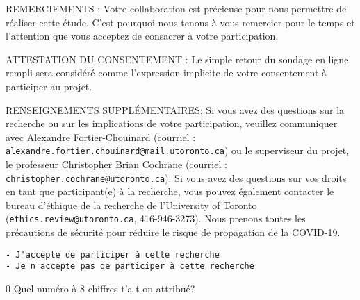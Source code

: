 \documentclass[
  letterpaper,
  DIV=11,
  numbers=noendperiod]{scrreprt}
\begin{document}
REMERCIEMENTS : Votre collaboration est précieuse pour nous permettre de
réaliser cette étude. C'est pourquoi nous tenons à vous remercier pour
le temps et l'attention que vous acceptez de consacrer à votre
participation.

ATTESTATION DU CONSENTEMENT : Le simple retour du sondage en ligne
rempli sera considéré comme l'expression implicite de votre consentement
à participer au projet.

RENSEIGNEMENTS SUPPLÉMENTAIRES: Si vous avez des questions sur la
recherche ou sur les implications de votre participation, veuillez
communiquer avec Alexandre Fortier-Chouinard (courriel :
\texttt{alexandre.fortier.chouinard@mail.utoronto.ca}) ou le superviseur
du projet, le professeur Christopher Brian Cochrane (courriel :
\texttt{christopher.cochrane@utoronto.ca}). Si vous avez des questions
sur vos droits en tant que participant(e) à la recherche, vous pouvez
également contacter le bureau d'éthique de la recherche de l'University
of Toronto (\texttt{ethics.review@utoronto.ca}, 416-946-3273). Nous
prenons toutes les précautions de sécurité pour réduire le risque de
propagation de la COVID-19.

\begin{verbatim}
- J'accepte de participer à cette recherche
- Je n'accepte pas de participer à cette recherche
\end{verbatim}

0 Quel numéro à 8 chiffres t'a-t-on attribué?
\end{document}
